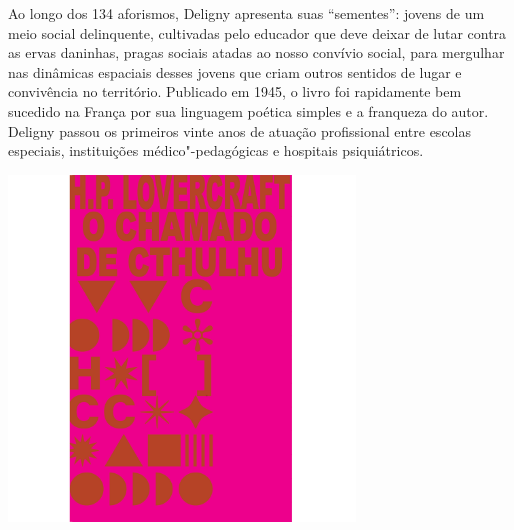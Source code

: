 Ao longo dos 134 aforismos, Deligny apresenta suas “sementes”: jovens de um meio social delinquente, cultivadas pelo educador que deve deixar de lutar contra as ervas daninhas, pragas sociais atadas ao nosso convívio social, para mergulhar nas dinâmicas espaciais desses jovens que criam outros sentidos de lugar e convivência no território. Publicado em 1945, o livro foi rapidamente bem sucedido na França por sua linguagem poética simples e a franqueza do autor. Deligny passou os primeiros vinte anos de atuação profissional entre escolas especiais, instituições médico"-pedagógicas e hospitais psiquiátricos.

\vfill

\hspace*{-.4cm}\begin{minipage}[c]{.5\linewidth}
\small{
{}}
\end{minipage}

\pagebreak


\begin{center}
\hspace*{-2.5cm}
\hspace*{2.5cm}\includegraphics[width=92mm]{./grid/lovecraft.jpg}
\end{center}

